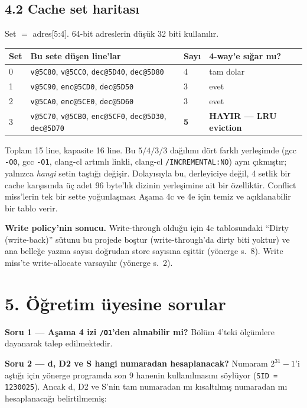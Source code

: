 \documentclass[11pt,a4paper]{article}
\newcommand{\tl}{\texttt}
\begin{document}
\subsection*{4.2 Cache set haritası}

Set $=$ adres[5:4]. 64-bit adreslerin düşük 32 biti kullanılır.

\begin{longtable}{p{1.3cm}p{9.0cm}p{1.8cm}p{2.6cm}}
\toprule
\textbf{Set} & \textbf{Bu sete düşen line'lar} & \textbf{Sayı} & \textbf{4-way'e sığar mı?}\\
\midrule
0 & \tl{v@5C80}, \tl{v@5CC0}, \tl{dec@5D40}, \tl{dec@5D80} & 4 & tam dolar\\
1 & \tl{v@5C90}, \tl{enc@5CD0}, \tl{dec@5D50} & 3 & evet\\
2 & \tl{v@5CA0}, \tl{enc@5CE0}, \tl{dec@5D60} & 3 & evet\\
3 & \tl{v@5C70}, \tl{v@5CB0}, \tl{enc@5CF0}, \tl{dec@5D30}, \tl{dec@5D70} & \textbf{5} & \textbf{HAYIR --- LRU eviction}\\
\bottomrule
\end{longtable}

Toplam 15 line, kapasite 16 line. Bu $5/4/3/3$ dağılımı dört farklı yerleşimde (gcc \tl{-O0},
gcc \tl{-O1}, clang-cl artımlı linkli, clang-cl \tl{/INCREMENTAL:NO}) aynı çıkmıştır; yalnızca
\textit{hangi} setin taştığı değişir.
Dolayısıyla bu, derleyiciye değil, 4 setlik bir cache karşısında üç adet 96 byte'lık dizinin
yerleşimine ait bir özelliktir. Conflict miss'lerin tek bir sette yoğunlaşması Aşama 4c ve 4e için
temiz ve açıklanabilir bir tablo verir.

\textbf{Write policy'nin sonucu.} Write-through olduğu için 4c tablosundaki ``Dirty (write-back)''
sütunu bu projede boştur (write-through'da dirty biti yoktur) ve ana belleğe yazma sayısı doğrudan
store sayısına eşittir (yönerge s.~8). Write miss'te write-allocate varsayılır (yönerge s.~2).

\section*{5. Öğretim üyesine sorular}

\textbf{Soru 1 --- Aşama 4 izi \tl{/O1}'den alınabilir mi?} Bölüm 4'teki ölçümlere dayanarak
talep edilmektedir.

\textbf{Soru 2 --- d, D2 ve S hangi numaradan hesaplanacak?} Numaram $2^{31}-1$'i aştığı için
yönerge programda son 9 hanenin kullanılmasını söylüyor (\tl{SID = 1230025}). Ancak d, D2 ve S'nin
tam numaradan mı kısaltılmış numaradan mı hesaplanacağı belirtilmemiş:
\end{document}
